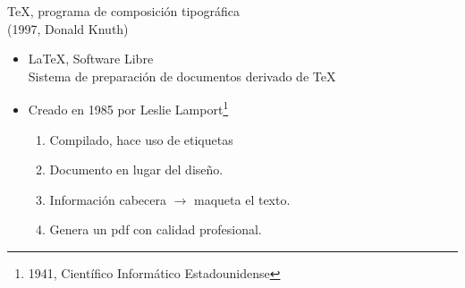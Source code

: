 \begin{frame}
   TeX, programa de composición tipográfica \\(1997, Donald Knuth)
   \begin{itemize}
        \item LaTeX, Software Libre \\Sistema de preparaci\'on de documentos derivado de TeX
        \item Creado en 1985 por Leslie Lamport\footnote{1941, Científico Informático Estadounidense}
        \vspace{1.5cm}
        \begin{enumerate}
            \item Compilado, hace uso de etiquetas
            \item Documento en lugar del diseño.
            \item Información cabecera $\rightarrow$ maqueta el texto.
            \item Genera un pdf con calidad profesional.
        \end{enumerate}
    \end{itemize}    
\end{frame}
